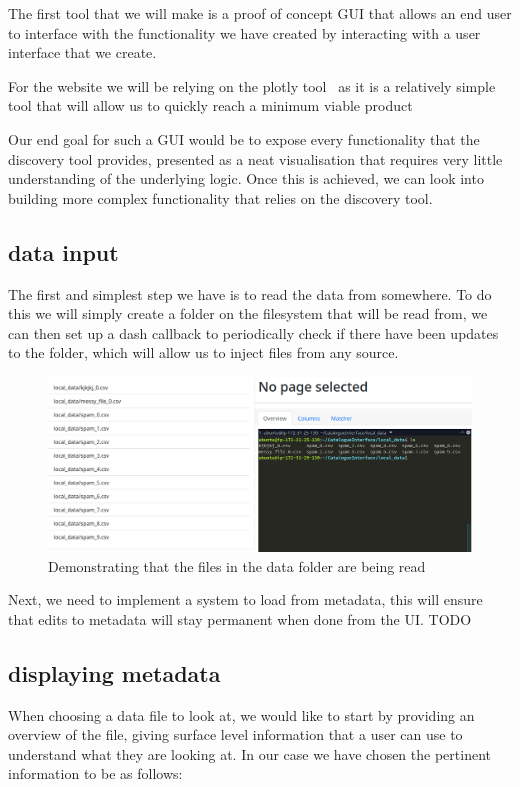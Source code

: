 The first tool that we will make is a proof of concept GUI that allows an end user to interface with the functionality
we have created by interacting with a user interface that we create.

For the website we will be relying on the plotly tool~\cite{plotlydash} as it is a relatively simple tool that will
allow us to quickly reach a minimum viable product

Our end goal for such a GUI would be to expose every functionality that the discovery tool provides, presented as a neat
visualisation that requires very little understanding of the underlying logic.
Once this is achieved, we can look into building more complex functionality that relies on the discovery tool.

\subsection{data input}\label{subsec:data-input}
The first and simplest step we have is to read the data from somewhere.
To do this we will simply create a folder on the filesystem that will be read from, we can then set up a dash callback
to periodically check if there have been updates to the folder, which will allow us to inject files from any source.

\begin{figure}[h]
    \centering
    \includegraphics[width=12cm]{figures/website_images/website_data_catalogue}
    \caption{Demonstrating that the files in the data folder are being read}\label{fig:catalogue_file_list}
\end{figure}

Next, we need to implement a system to load from metadata, this will ensure that edits to metadata will stay permanent
when done from the UI\@.
TODO

\subsection{displaying metadata}\label{subsec:displaying-metadata}
When choosing a data file to look at, we would like to start by providing an overview of the file, giving surface level
information that a user can use to understand what they are looking at.
In our case we have chosen the pertinent information to be as follows:

